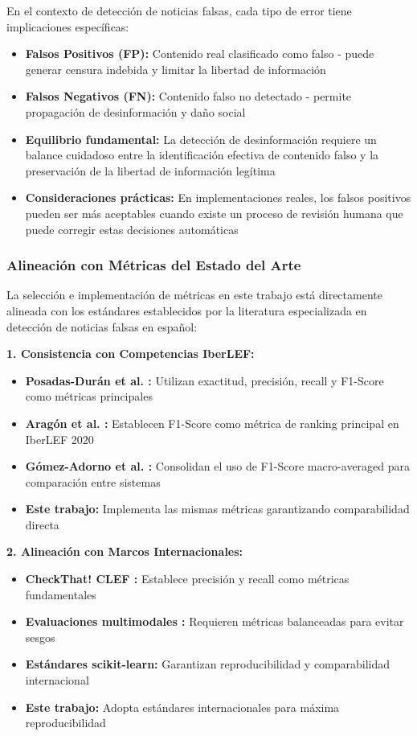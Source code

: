 En el contexto de detección de noticias falsas, cada tipo de error tiene implicaciones específicas:

\begin{itemize}
    \item \textbf{Falsos Positivos (FP):} Contenido real clasificado como falso - puede generar censura indebida y limitar la libertad de información
    \item \textbf{Falsos Negativos (FN):} Contenido falso no detectado - permite propagación de desinformación y daño social
    \item \textbf{Equilibrio fundamental:} La detección de desinformación requiere un balance cuidadoso entre la identificación efectiva de contenido falso y la preservación de la libertad de información legítima
    \item \textbf{Consideraciones prácticas:} En implementaciones reales, los falsos positivos pueden ser más aceptables cuando existe un proceso de revisión humana que puede corregir estas decisiones automáticas
\end{itemize}

\subsubsection{Alineación con Métricas del Estado del Arte}

La selección e implementación de métricas en este trabajo está directamente alineada con los estándares establecidos por la literatura especializada en detección de noticias falsas en español:

\textbf{1. Consistencia con Competencias IberLEF:}
\begin{itemize}
    \item \textbf{Posadas-Durán et al. \cite{posadas2019detection}:} Utilizan exactitud, precisión, recall y F1-Score como métricas principales
    \item \textbf{Aragón et al. \cite{aragon2020overview}:} Establecen F1-Score como métrica de ranking principal en IberLEF 2020
    \item \textbf{Gómez-Adorno et al. \cite{gomez2021overview}:} Consolidan el uso de F1-Score macro-averaged para comparación entre sistemas
    \item \textbf{Este trabajo:} Implementa las mismas métricas garantizando comparabilidad directa
\end{itemize}

\textbf{2. Alineación con Marcos Internacionales:}
\begin{itemize}
    \item \textbf{CheckThat! CLEF \cite{barron2023clef}:} Establece precisión y recall como métricas fundamentales
    \item \textbf{Evaluaciones multimodales \cite{alam2023overview}:} Requieren métricas balanceadas para evitar sesgos
    \item \textbf{Estándares scikit-learn:} Garantizan reproducibilidad y comparabilidad internacional
    \item \textbf{Este trabajo:} Adopta estándares internacionales para máxima reproducibilidad
\end{itemize}

